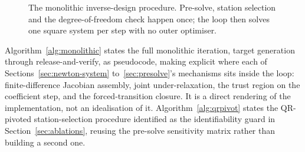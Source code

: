 \begin{figure}[htbp]
\caption{The monolithic inverse-design procedure. Pre-solve, station selection
and the degree-of-freedom check happen once; the loop then solves one square
system per step with no outer optimiser.}
\label{fig:pipeline}
\end{figure}

Algorithm~\ref{alg:monolithic} states the full monolithic iteration, target
generation through release-and-verify, as pseudocode, making explicit where
each of Sections~\ref{sec:newton-system} to~\ref{sec:presolve}'s mechanisms
sits inside the loop: finite-difference Jacobian assembly, joint
under-relaxation, the trust region on the coefficient step, and the
forced-transition closure. It is a direct rendering of the implementation, not
an idealisation of it. Algorithm~\ref{alg:qrpivot} states the QR-pivoted
station-selection procedure identified as the identifiability guard in
Section~\ref{sec:ablations}, reusing the pre-solve sensitivity matrix rather
than building a second one.


